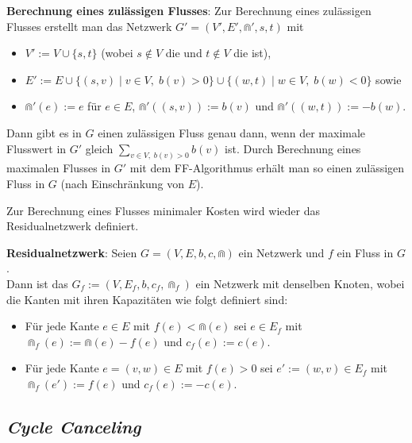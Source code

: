 \linie

\textbf{Berechnung eines zulässigen Flusses}:
Zur Berechnung eines zulässigen Flusses erstellt man das Netzwerk $G' = (V', E', \Cap', s, t)$
mit
\begin{itemize}
    \item
    $V' := V \cup \{s, t\}$
    (wobei $s \notin V$ die  und $t \notin V$ die  ist),

    \item
    $E' := E \cup \{(s, v) \;|\; v \in V,\; b(v) > 0\} \cup \{(w, t) \;|\; w \in V,\; b(w) < 0\}$
    sowie

    \item
    $\Cap'(e) := e$ für $e \in E$, $\Cap'((s, v)) := b(v)$ und $\Cap'((w, t)) := -b(w)$.
\end{itemize}
Dann gibt es in $G$ einen zulässigen Fluss genau dann, wenn der maximale Flusswert in $G'$
gleich $\sum_{v \in V,\; b(v) > 0} b(v)$ ist.
Durch Berechnung eines maximalen Flusses in $G'$ mit dem FF-Algorithmus erhält man so einen
zulässigen Fluss in $G$ (nach Einschränkung von $E$).

\linie

Zur Berechnung eines Flusses minimaler Kosten wird wieder das Residualnetzwerk definiert.

\textbf{Residualnetzwerk}:
Seien $G = (V, E, b, c, \Cap)$ ein Netzwerk und $f$ ein Fluss in $G$.\\
Dann ist das  $G_f := (V, E_f, b, c_f, \Cap_f)$ ein Netzwerk
mit denselben Knoten, wobei die Kanten mit ihren Kapazitäten wie folgt definiert sind:
\begin{itemize}
    \item
    Für jede Kante $e \in E$ mit $f(e) < \Cap(e)$ sei $e \in E_f$ mit\\
    $\Cap_f(e) := \Cap(e) - f(e)$ und $c_f(e) := c(e)$.

    \item
    Für jede Kante $e = (v, w) \in E$ mit $f(e) > 0$ sei $e' := (w, v) \in E_f$ mit\\
    $\Cap_f(e') := f(e)$ und $c_f(e) := -c(e)$.
\end{itemize}

\pagebreak

\subsection{%
    \emph{Cycle Canceling}%
}


